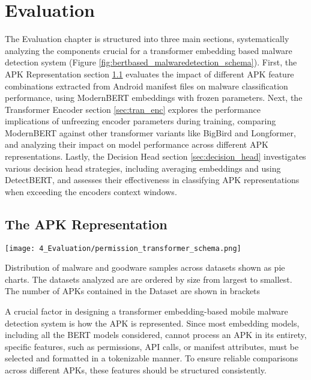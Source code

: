 \chapter{Evaluation}

\label{Evaluation} %

The Evaluation chapter is structured into three main sections, 
systematically analyzing the components crucial for a transformer embedding based malware detection system 
(Figure \ref{fig:bertbased_malwaredetection_schema}). 
First, the APK Representation section \ref{sec:apkrepresentation} evaluates the impact of different APK feature combinations extracted 
from Android manifest files on malware classification performance, using ModernBERT embeddings with frozen parameters. 
Next, the Transformer Encoder section \ref{sec:tran_enc} explores the performance implications of unfreezing encoder parameters during training, 
comparing ModernBERT against other transformer variants like BigBird and Longformer, 
and analyzing their impact on model performance across different APK representations. 
Lastly, the Decision Head section \ref{sec:decision_head} investigates various decision head strategies, 
including averaging embeddings and using DetectBERT, and assesses their effectiveness in classifying APK representations 
when exceeding the encoders context windows.

\section{The APK Representation}
\label{sec:apkrepresentation}

\begin{marginfigure}[3\baselineskip] %
    \center
    \texttt{[image: 4\_Evaluation/permission\_transformer\_schema.png]}
    \caption{\label{fig:permission_transformer_schema}
    Distribution of malware and goodware samples across datasets shown as pie charts.
    The datasets analyzed are are ordered by size from largest to smallest.
    The number of APKs contained in the Dataset are shown in brackets}
\end{marginfigure}

A crucial factor in designing a transformer embedding-based mobile malware detection system is how the APK is represented. 
Since most embedding models, including all the BERT models considered, cannot process an APK in its entirety, 
specific features, such as permissions, API calls, or manifest attributes, must be selected and formatted in a tokenizable manner. 
To ensure reliable comparisons across different APKs, these features should be structured consistently.

